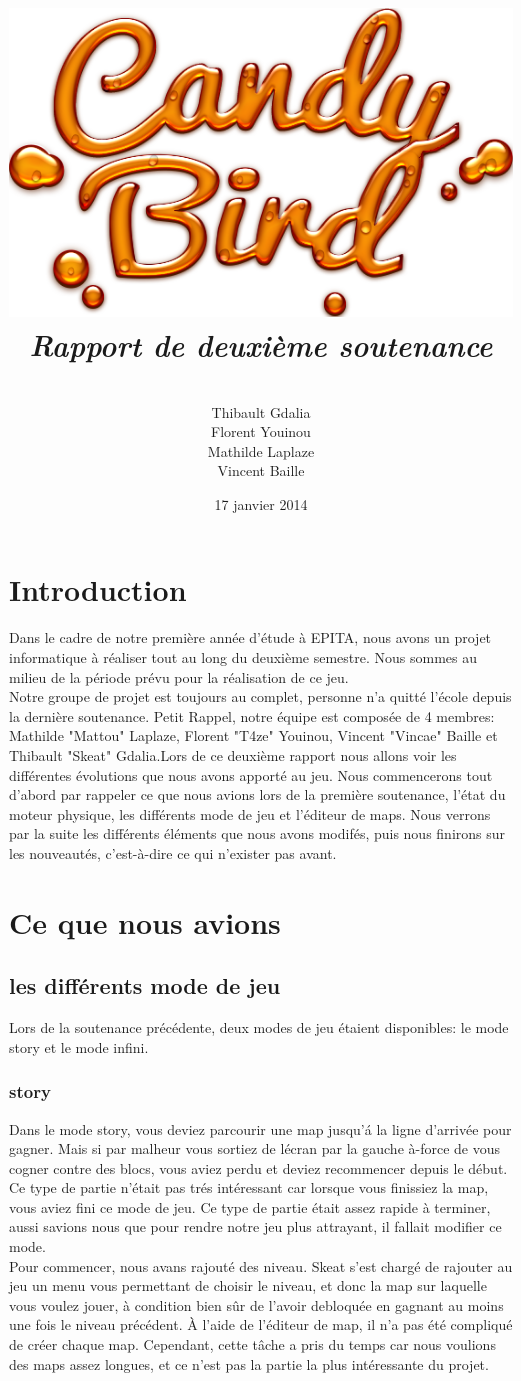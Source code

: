 \documentclass [11pt]{report}
\title{
	\includegraphics[scale=0.43]{images/Logojeu.png}
	 \\\vspace{20mm}
	\textbf{\Huge \itshape Rapport de deuxi\`eme soutenance  }
	}
\author{ \\\vspace{2mm}
	Thibault Gdalia\\\vspace{2mm}
	Florent Youinou\\\vspace{2mm}
	Mathilde Laplaze\\\vspace{2mm}
	Vincent Baille \\\vspace{30mm}
	}
\date{17 janvier 2014}
\begin{document}
\thispagestyle{fancy}
\renewcommand{\baselinestretch}{0.001}
\maketitle
\tableofcontents
\chapter*{Introduction} 
Dans le cadre de notre premi\`ere ann\'ee d'\'etude \`a EPITA, nous avons un projet informatique \`a r\'ealiser tout au long du deuxi\`eme semestre. Nous sommes au milieu de la p\'eriode pr\'evu pour la r\'ealisation de ce jeu. \\

Notre groupe de projet est toujours au complet, personne n'a quitt\'e l'\'ecole depuis la derni\`ere soutenance. Petit Rappel, notre \'equipe est compos\'ee de 4 membres: Mathilde "Mattou" Laplaze, Florent "T4ze" Youinou, Vincent "Vincae" Baille et Thibault "Skeat" Gdalia.Lors de ce deuxi\`eme rapport nous allons voir les diff\'erentes \'evolutions que nous avons apport\'e au jeu. Nous commencerons tout d'abord par rappeler ce que nous avions lors de la premi\`ere soutenance, l'\'etat du moteur physique, les diff\'erents mode de jeu et l'\'editeur de maps. Nous verrons par la suite les diff\'erents \'el\'ements que nous avons modif\'es, puis nous finirons sur les nouveaut\'es, c'est-\`a-dire ce qui n'exister pas avant.

\chapter{Ce que nous avions}
	\section{les diff\'erents mode de jeu}
		Lors de la soutenance pr\'ec\'edente, deux modes de jeu \'etaient disponibles: le mode story et le mode infini.
		\subsection{story}
			Dans le mode story, vous deviez parcourir une map jusqu'\'a la ligne d'arriv\'ee pour gagner. Mais si par malheur vous sortiez de l\'ecran par la gauche \`a-force de vous cogner contre des blocs, vous aviez perdu et deviez recommencer depuis le d\'ebut. Ce type de partie n'\'etait pas tr\'es int\'eressant car lorsque vous finissiez la map, vous aviez fini ce mode de jeu. Ce type de partie \'etait assez rapide \`a terminer, aussi savions nous que pour rendre notre jeu plus attrayant, il fallait modifier ce mode. \\
			\indent Pour commencer, nous avans rajout\'e des niveau. Skeat s'est charg\'e de rajouter au jeu  un menu vous permettant de choisir le niveau, et donc la map sur laquelle vous voulez jouer, \`a condition bien s\^ur de l'avoir debloqu\'ee en gagnant au moins une fois le niveau pr\'ec\'edent. \`A l'aide de l'\'editeur de map, il n'a pas \'et\'e compliqu\'e de cr\'eer chaque map. Cependant, cette t\^ache a pris du temps car nous voulions des maps assez longues, et ce n'est pas la partie la plus int\'eressante du projet.\\
\end{document}
